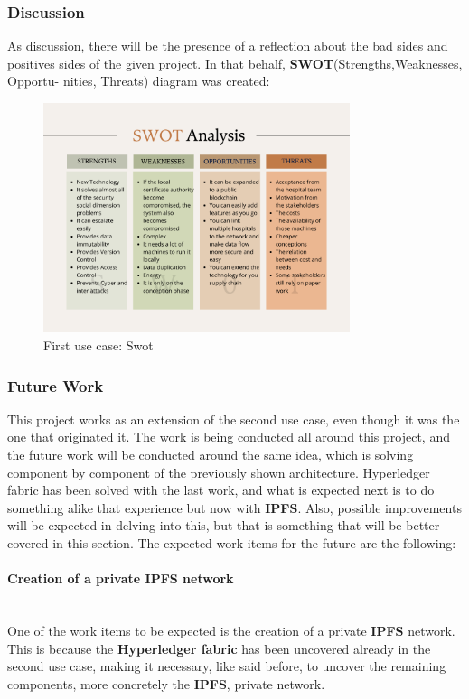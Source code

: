 \subsubsection{Discussion}
As discussion, there will be the presence of a  reflection about the bad sides and positives sides of the given project. In that behalf, \textbf{SWOT}(Strengths,Weaknesses, Opportu-
nities, Threats) diagram was created:

\begin{figure}[H]
    \centering
    \includegraphics[width=0.8\textwidth]{assets/use-case-1/swot.png} %
    \caption{First use case: Swot}
    \label{fig:sample-image} 
\end{figure}

\subsubsection{Future Work}
This project works as an extension of the second use case, even though it was the one that originated it. The work is being conducted all around this project, and the future work will be conducted around the same idea, which is solving component by component of the previously shown architecture. Hyperledger fabric has been solved with the last work, and what is expected next is to do something alike that experience but now with \textbf{IPFS}. Also, possible improvements will be expected in delving into this, but that is something that will be better covered in this section. The expected work items for the future are the following:

\paragraph{Creation of a private IPFS network} \mbox{} \\
One of the work items to be expected is the creation of a private \textbf{IPFS} network. This is because the \textbf{Hyperledger fabric} has been uncovered already in the second use case, making it necessary, like said before, to uncover the remaining components, more concretely the \textbf{IPFS}, private network.

